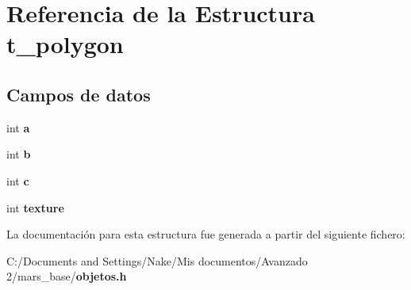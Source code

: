 \section{Referencia de la Estructura t\_\-polygon}
\label{structt__polygon}
\subsection*{Campos de datos}
\begin{DoxyCompactItemize}
\item 
int {\bfseries a}\label{structt__polygon_aa4c2a5552e9bc49b1816ff532f558c74}

\item 
int {\bfseries b}\label{structt__polygon_a148e3876077787926724625411d6e7a9}

\item 
int {\bfseries c}\label{structt__polygon_a4e1e0e72dd773439e333c84dd762a9c3}

\item 
int {\bfseries texture}\label{structt__polygon_a9784cd49d66743fe8c75ec6d73b216c1}

\end{DoxyCompactItemize}


La documentación para esta estructura fue generada a partir del siguiente fichero:\begin{DoxyCompactItemize}
\item 
C:/Documents and Settings/Nake/Mis documentos/Avanzado 2/mars\_\-base/{\bf objetos.h}\end{DoxyCompactItemize}
